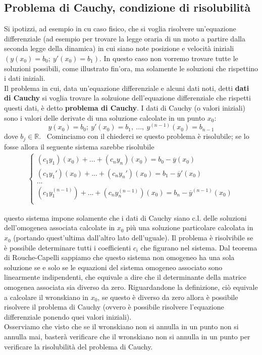 \documentclass[10pt,a4paper]{article}
\begin{document}
\subsection{Problema di Cauchy, condizione di risolubilità}
Si ipotizzi, ad esempio in cu caso fisico, che si voglia risolvere un'equazione differenziale (ad esempio per trovare la legge oraria di un moto a partire dalla seconda legge della dinamica) in cui siano note posizione e velocità iniziali \((y(x_0)=b_0;\ y'(x_0)=b_1)\). In questo caso non vorremo trovare tutte le soluzioni possibili, come illustrato fin'ora, ma solamente le soluzioni che rispettino i dati iniziali.\\
Il problema in cui, data un'equazione differenziale e alcuni dati noti, detti \textbf{dati di Cauchy} si voglia trovare la solzuione dell'equazione differenziale che rispetti questi dati, è detto \textbf{problema di Cauchy}. I dati di Cauchy (o valori iniziali) sono i valori delle derivate di una soluzione calcolate in un punto \(x_0\):
\[y(x_0)=b_0;\ y'(x_0)=b_1,\ ...,\ y^{(n-1)}(x_0)=b_{n-1}\]
dove \(b_j\in \mathbb{R}\). \
Cominciamo con il chiederci se questo problema è risolubile; se lo fosse allora il seguente sistema sarebbe risolubile
\begin{align*}
	\begin{cases}
		(c_1 y_1)(x_0) +...+ (c_n y_n)(x_0)=b_0-\overline{y}(x_0)\\
		(c_1 y_1')(x_0) +...+ (c_n y_n')(x_0)=b_1-\overline{y}'(x_0)\\
		...\\
		(c_1 y_1^{(n-1)}) +...+ (c_n y_n^{(n-1)})(x_0)=b_n-\overline{y}^{(n-1)}(x_0)\\
	\end{cases}
\end{align*}

questo sistema impone solamente che i dati di Cauchy siano c.l. delle soluzioni dell'omogenea associata calcolate in \(x_0\) più una soluzione particolare calcolata in \(x_0\) (portando quest'ultima dall'altro lato dell'uguale). Il problema è risolvibile se è possibile determinare tutti i coefficienti \(c_i\) che figurano nel sistema. Dal teorema di Rouche-Capelli sappiamo che questo sistema non omogeneo ha una sola soluzione se e solo se le equazioni del sistema omogeneo associato sono linearmente indipendenti, che equivale a dire che il determinante della matrice omogenea associata sia diverso da zero. Riguardandone la definizione, ciò equivale a calcolare il wronskiano in \(x_0\), se questo è diverso da zero allora è possibile risolvere il problema di Cauchy (ovvero è possibile risolvere l'equazione differenziale ponendo quei valori iniziali).\\
Osserviamo che visto che se il wronskiano non si annulla in un punto non si annulla mai, basterà verificare che il wronskiano non si annulla in un punto per verificare la risolubilità del problema di Cauchy.
\end{document}

